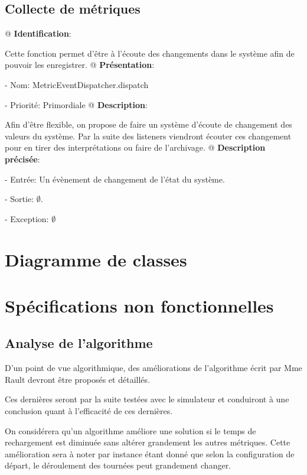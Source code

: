 \documentclass[final]{polytech/polytech}
\begin{document}
	\section{Collecte de métriques}
		\begin{easylist}[enumerate]
			@ \textbf{Identification}:
			
			Cette fonction permet d'être à l'écoute des changements dans le système afin de pouvoir les enregistrer.
			@ \textbf{Présentation}:
			
			- Nom: MetricEventDispatcher.dispatch
			
			- Priorité: Primordiale
			@ \textbf{Description}:
			
			Afin d'être flexible, on propose de faire un système d'écoute de changement des valeurs du système.
			Par la suite des listeners viendront écouter ces changement pour en tirer des interprétations ou faire de l'archivage.
			@ \textbf{Description précisée}:
			
			- Entrée: Un évènement de changement de l'état du système.
			
			- Sortie: $\emptyset$.
			
			- Exception: $\emptyset$
		\end{easylist}
	
\chapter{Diagramme de classes}
	\vspace{-50pt}
			
\chapter{Spécifications non fonctionnelles}
	\section{Analyse de l'algorithme}
		D'un point de vue algorithmique, des améliorations de l'algorithme écrit par Mme Rault \cite{Rault:chargers} devront être proposés et détaillés.
			
		Ces dernières seront par la suite testées avec le simulateur et conduiront à une conclusion quant à l'efficacité de ces dernières.
		
		On considérera qu'un algorithme améliore une solution si le temps de rechargement est diminuée sans altérer grandement les autres métriques.
		Cette amélioration sera à noter par instance étant donné que selon la configuration de départ, le déroulement des tournées peut grandement changer.
		
\end{document}
